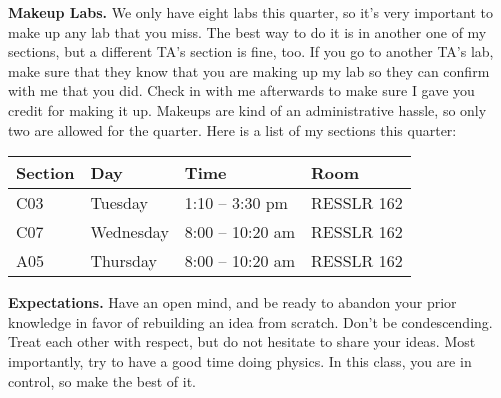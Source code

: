 \documentclass[letterpaper, 11pt]{article}
\begin{document}
\textbf{Makeup Labs.} We only have eight labs this quarter, so it’s very important to make up any lab that you miss. The best way to do it is in another one of my sections, but a different TA’s section is fine, too. If you go to another TA’s lab, make sure that they know that you are making up my lab so they can confirm with me that you did. Check in with me afterwards to make sure I gave you credit for making it up. Makeups are kind of an administrative hassle, so only two are allowed for the quarter. Here is a list of my sections this quarter:
\begin{table}[H]
    \centering
    \begin{tabular}{llll}
        \textbf{Section} & \textbf{Day} & \textbf{Time} & \textbf{Room} \\
        \toprule
        C03 & Tuesday & 1:10 -- 3:30 pm & RESSLR 162 \\
        C07 & Wednesday & 8:00 -- 10:20 am & RESSLR 162 \\
        A05 & Thursday & 8:00 -- 10:20 am & RESSLR 162 \\
        \bottomrule
    \end{tabular}
\end{table}

\textbf{Expectations.} Have an open mind, and be ready to abandon your prior knowledge in favor of rebuilding an idea from scratch. Don’t be condescending. Treat each other with respect, but do not hesitate to share your ideas. Most importantly, try to have a good time doing physics. In this class, you are in control, so make the best of it.
\end{document}
